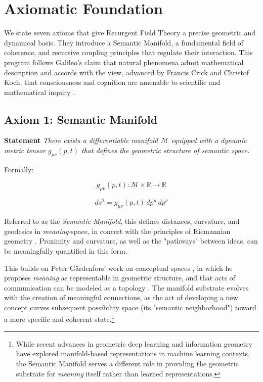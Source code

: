 \chapter{Axiomatic Foundation}
\label{1:axiomatic_foundation}

We state seven axioms that give Recurgent Field Theory a precise geometric and dynamical basis. They introduce a Semantic Manifold, a fundamental field of coherence, and recursive coupling principles that regulate their interaction. This program follows Galileo's claim that natural phenomena admit mathematical description \autocite{Galilei1623} and accords with the view, advanced by Francis Crick and Christof Koch, that consciousness and cognition are amenable to scientific and mathematical inquiry \autocite{Crick1990, KochConsciousness2019}.


\section{Axiom 1: Semantic Manifold}
\label{1.1:axiom_1_semantic_manifold}

\textbf{Statement} \textit{There exists a differentiable manifold \(\mathcal{M}\) equipped with a dynamic metric tensor \(g_{\mu\nu}(p,t)\) that defines the geometric structure of semantic space.}

Formally:

\begin{equation}
g_{\mu\nu}(p,t) : \mathcal{M} \times \mathbb{R} \rightarrow \mathbb{R}
\end{equation}

\begin{equation}
ds^2 = g_{\mu\nu}(p,t) \, dp^\mu \, dp^\nu
\end{equation}

Referred to as the \textit{Semantic Manifold}, this defines distances, curvature, and geodesics in \textit{meaning}-space, in concert with the principles of Riemannian geometry \autocite{Riemann1868}. Proximity and curvature, as well as the "pathways" between ideas, can be meaningfully quantified in this form.

This builds on Peter Gärdenfors' work on conceptual spaces \autocite{Gardenfors2000}, in which he proposes \textit{meaning} as representable in geometric structure, and that acts of communication can be modeled as a topology \autocite{Gardenfors2014}. The manifold substrate evolves with the creation of meaningful connections, as the act of developing a new concept curves subsequent possibility space (its "semantic neighborhood") toward a more specific and coherent state.\footnote{While recent advances in geometric deep learning \autocite{Bronstein2021} and information geometry \autocite{Amari2016} have explored manifold-based representations in machine learning contexts, the Semantic Manifold serves a different role in providing the geometric substrate for \textit{meaning} itself rather than learned representations.}

